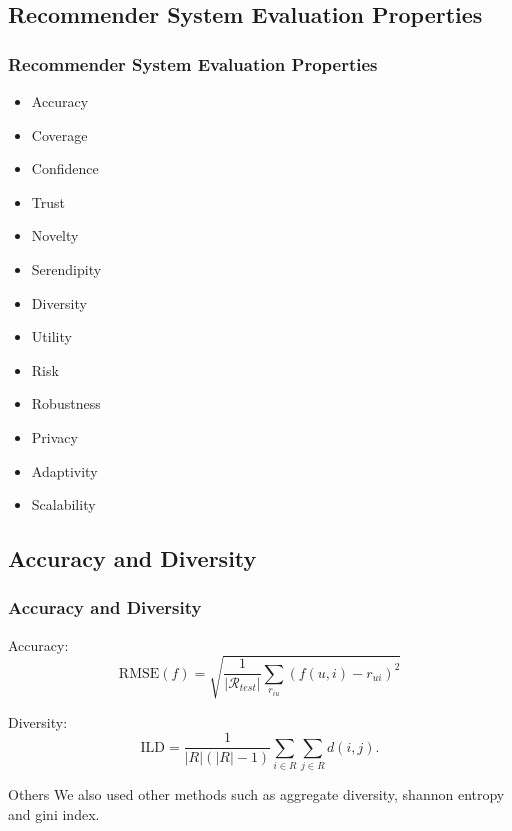 \documentclass{beamer}
\begin{document}


\subsection{Recommender System Evaluation Properties}
\begin{frame} 
\frametitle{Recommender System Evaluation Properties} 
\begin{itemize}
	\item Accuracy
	\item Coverage
	\item Confidence
	\item Trust
	\item Novelty
	\item Serendipity
	\item Diversity
	\item Utility
	\item Risk
	\item Robustness
	\item Privacy
	\item Adaptivity
	\item Scalability
\end{itemize} 
\end{frame}



\subsection{Accuracy and Diversity} 
\begin{frame}
\frametitle{Accuracy and Diversity}

Accuracy:
\begin{equation}
\mathrm { RMSE } ( f ) = \sqrt { \frac { 1 } { \left| \mathcal { R } _ { test} \right| } \sum _ { r _ { i u } } \left( f ( u , i ) - r _ { u i } \right) ^ { 2 } }
\label{eq:rmse}
\end{equation}

Diversity:
\begin{equation}
\mathrm { ILD } = \frac { 1 } { | R | ( | R | - 1 ) } \sum _ { i \in R } \sum _ { j \in R } d ( i , j ) .
\label{eq:ild}
\end{equation}

 \begin{block}{Others}
	We also used other methods such as aggregate diversity, shannon entropy and gini index.
\end{block}

\end{frame}
\end{document}
